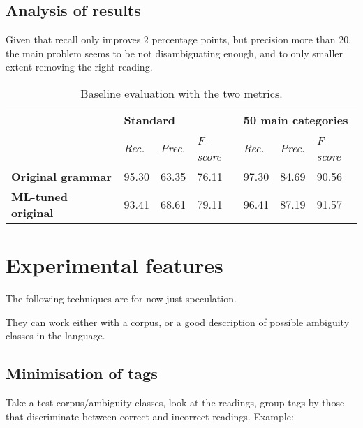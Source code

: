 \documentclass[11pt]{article}
\begin{document}
\subsection{Analysis of results}
Given that recall only improves 2 percentage points, but precision more than 20, the main problem
seems to be not disambiguating enough, and to only smaller extent removing the right reading.




\begin{table*}[t]
\centering
\label{my-label}
\begin{tabular}{l|l|l|l|l|l|l|}
\cline{2-7}
                                                 & \multicolumn{3}{l|}{\textbf{Standard}}            & \multicolumn{3}{l|}{\textbf{50 main categories}}  \\ \cline{2-7} 
                                                 & \textit{Rec.} & \textit{Prec.} & \textit{F-score} & \textit{Rec.} & \textit{Prec.} & \textit{F-score} \\ \hline
\multicolumn{1}{|l|}{\textbf{Original grammar}}  & 95.30       & 63.35        & 76.11    &  97.30        &  84.69         &  90.56           \\ \hline
\multicolumn{1}{|l|}{\textbf{ML-tuned original}} & 93.41       & 68.61        & 79.11    &  96.41        &  87.19         &  91.57           \\ \hline
\end{tabular}
\caption{Baseline evaluation with the two metrics.}
\label{table:res}
\end{table*}






\section{Experimental features}

The following techniques are for now just speculation.

They can work either with a corpus, or a good description of possible ambiguity classes in the language.

\subsection{Minimisation of tags}


Take a test corpus/ambiguity classes, look at the readings, 
group tags by those that discriminate between correct and incorrect readings.
Example:
\end{document}
